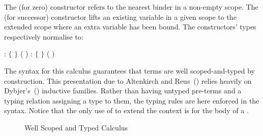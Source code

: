 The  (for zero) constructor refers to the nearest binder in a non-empty scope.
The  (for successor) constructor lifts an existing variable in a given scope
to the extended scope where an extra variable has been bound. The constructors' types
respectively normalise to:

\begin{center}
   : { $\lbrace$ $\rbrace$ 
              ( \AIC{::} )}
  \qquad
   : { $\lbrace$  $\rbrace$ 
                  ( \AIC{::} )}
\end{center}

The syntax for this calculus guarantees that terms are well scoped-and-typed
by construction. This presentation due to
Altenkirch and Reus~(\citeyear{altenkirch1999monadic}) relies heavily on
Dybjer's~(\citeyear{dybjer1991inductive}) inductive families. Rather than
having untyped pre-terms and a typing relation assigning a type to
them, the typing rules are here enforced in the syntax. Notice that
the only use of  to extend the context is for the body of
a .

\begin{figure}[h]
\caption{Well Scoped and Typed Calculus\label{fig:term}}
\end{figure}
